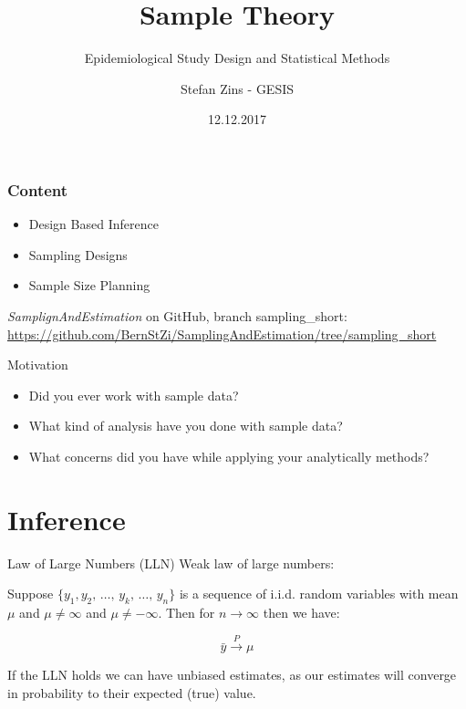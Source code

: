 \documentclass{beamer}\usepackage[]{graphicx}\usepackage[]{color}
\title{Sample Theory}
\subtitle{Epidemiological Study Design and Statistical Methods}
\author{Stefan Zins - GESIS}
\date{12.12.2017}
\begin{document}
\gesismaketitle %

\begin{frame}%
  \frametitle{Content}
  
  \begin{itemize}
  \item Design Based Inference
  \item Sampling Designs
  \item Sample Size Planning
  \end{itemize}


\emph{SamplignAndEstimation} on GitHub, branch sampling\_short:
\url{https://github.com/BernStZi/SamplingAndEstimation/tree/sampling_short}
\end{frame}


\begin{frame}{Motivation}
 \begin{itemize}
    \item<1,4>  Did you ever work with sample data? 
    \item<2,4> What kind of analysis have you done with sample data?
    \item<3,4>  What concerns did you have while applying your analytically methods?
  \end{itemize}
\end{frame}

\section{Inference}


\begin{frame}{Law of Large Numbers (LLN)}
Weak law of large numbers: 

Suppose $ \{ y_1{,}y_2{,}\,\ldots{,}\,y_k{,}\,\ldots{,}\,y_n \}$ is a sequence of i.i.d. random variables with mean $\mu$ and $\mu \neq \infty$ and $\mu \neq -\infty$. Then for $n \rightarrow \infty$ then we have:

$$
\bar{y} \xrightarrow{P} \mu
$$

If the LLN holds we can have unbiased estimates, as our estimates will converge in probability to their expected (true) value.
\end{frame}
\end{document}
